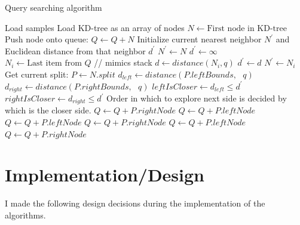 \documentclass[11pt]{amsart}
\begin{document}
\begin{algorithm}[!t]
\caption{Query searching algorithm}
\label{query_searching}
\begin{algorithmic}[1]
\State Load samples
\State Load KD-tree as an array of nodes
\State
{}
\State $N \gets \text{First node in KD-tree}$
\State Push node onto queue: $Q \gets Q + N$
\State
\State Initialize current nearest neighbor $N^\prime$ and Euclidean distance from that neighbor $d^\prime$
\State $N^\prime \gets N$
\State $d^\prime \gets \infty$
\State
{}
\State $N_i \gets \text{Last item from } Q$ \hspace{0.5in}// mimics stack
\State $d \gets distance(N_i, q)$
\State $d^\prime \gets d$
\State $N^\prime \gets N_i$
\EndIf
\Else
\State Get current split: $P \gets N.split$
\State $d_{left} \gets distance(P.leftBounds,\text{ } q)$ 
\State $d_{right} \gets distance(P.rightBounds,\text{ } q)$ 
\State
\State $leftIsCloser \gets d_{left} \leq d^\prime$ 
\State $rightIsCloser \gets d_{right}  \leq d^\prime$ 
\State
{} 
\State Order in which to explore next side is decided by which is the closer side.
\State $Q \gets Q + P.rightNode$
\State $Q \gets Q + P.leftNode$
\Else
\State $Q \gets Q + P.leftNode$
\State $Q \gets Q + P.rightNode$
\EndIf
{} 
\State $Q \gets Q + P.leftNode$
\State $Q \gets Q + P.rightNode$
\EndIf
\EndIf
\EndWhile
\EndProcedure
\end{algorithmic}
\end{algorithm}


\section{Implementation/Design}
\label{sec:implementation}

I made the following design decisions during the implementation of the algorithms.
\end{document}
